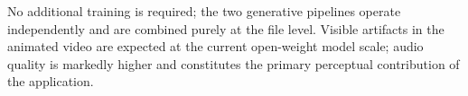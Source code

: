 \documentclass[10pt,twocolumn,letterpaper]{article}
\begin{document}
No additional training is required; the two generative pipelines operate independently and are combined purely at the file level.
Visible artifacts in the animated video are expected at the current open-weight model scale; audio quality is markedly higher and constitutes the primary perceptual contribution of the application.
\end{document}
